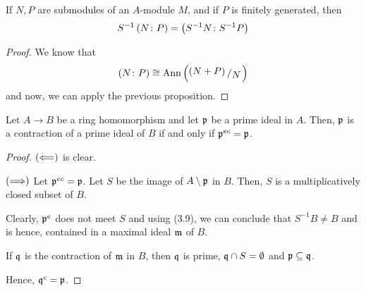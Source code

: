 \begin{corollary}{}{}
	If \(N, P\) are submodules of an \(A\)-module \(M\), and if \(P\)
	is finitely generated, then
	\[
		S^{-1} \left( N \colon P \right) = \left( S^{-1}N \colon S^{-1}P \right)
	\]
\end{corollary}
\begin{proof}
	We know that
	\[
		\brak{N \colon P} \cong \Ann \brak{\bigslant{\brak{N + P}}{N}}
	\]
	and now, we can apply the previous proposition.
\end{proof}

\begin{proposition}{}{}
	Let \(A \to B\) be a ring homomorphism and let \(\mathfrak{p}\) be a prime
	ideal in \(A\).
	Then, \(\mathfrak{p}\) is a contraction of a prime ideal of \(B\) if and
	only if \(\mathfrak{p}^{ec} = \mathfrak{p}\).
\end{proposition}
\begin{proof}
	\(\left( \Longleftarrow \right)\) is clear.

	\(\left( \Longrightarrow \right)\)
	Let \(\mathfrak{p}^{ec} = \mathfrak{p}\).
	Let \(S\) be the image of \(A \setminus \mathfrak{p}\) in \(B\).
	Then, \(S\) is a multiplicatively closed subset of \(B\).

	Clearly, \(\mathfrak{p}^e\) does not meet \(S\) and using (3.9), we can
	conclude that \(S^{-1}B \neq B\) and is hence, contained in a maximal
	ideal \(\mathfrak{m}\) of \(B\).

	If \(\mathfrak{q}\) is the contraction of \(\mathfrak{m}\) in \(B\), then \(\mathfrak{q}\)
	is prime, \(\mathfrak{q} \cap S = \emptyset\) and \(\mathfrak{p} \subseteq \mathfrak{q}\).

	Hence, \(\mathfrak{q}^c = \mathfrak{p}\).
\end{proof}
